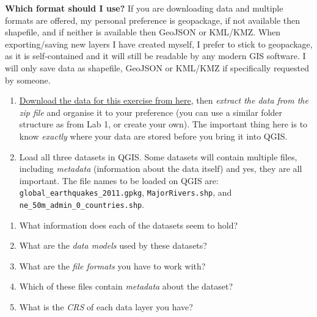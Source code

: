 \documentclass[
  letterpaper,
  DIV=11,
  numbers=noendperiod]{scrreprt}
\begin{document}
\begin{tcolorbox}
\textbf{Which format should I use?} If you are downloading data and
multiple formats are offered, my personal preference is geopackage, if
not available then shapefile, and if neither is available then GeoJSON
or KML/KMZ. When exporting/saving new layers I have created myself, I
prefer to stick to geopackage, as it is self-contained and it will still
be readable by any modern GIS software. I will only save data as
shapefile, GeoJSON or KML/KMZ if specifically requested by someone.

\end{tcolorbox}

\begin{enumerate}
\def\labelenumi{(\arabic{enumi})}
\setcounter{enumi}{68}
\item
  \href{https://stir-my.sharepoint.com/:f:/g/personal/ala2_stir_ac_uk/EkD-gndA8ihElmcQFirYbPEBN6qvH2tzyLgJ8UujpCXi2Q?e=tsvmoG}{Download
  the data for this exercise from here}, then \emph{extract the data
  from the zip file} and organise it to your preference (you can use a
  similar folder structure as from Lab 1, or create your own). The
  important thing here is to know \emph{exactly} where your data are
  stored before you bring it into QGIS.
\item
  Load all three datasets in QGIS. Some datasets will contain multiple
  files, including \emph{metadata} (information about the data itself)
  and yes, they are all important. The file names to be loaded on QGIS
  are: \texttt{global\_earthquakes\_2011.gpkg},
  \texttt{MajorRivers.shp}, and
  \texttt{ne\_50m\_admin\_0\_countries.shp}.
\end{enumerate}

\begin{tcolorbox}[enhanced jigsaw, breakable, toptitle=1mm, colback=white, left=2mm, leftrule=.75mm, titlerule=0mm, colframe=quarto-callout-important-color-frame, opacityback=0, title=\textcolor{quarto-callout-important-color}{\faExclamation}\hspace{0.5em}{Stop and Think}, toprule=.15mm, opacitybacktitle=0.6, bottomtitle=1mm, colbacktitle=quarto-callout-important-color!10!white, bottomrule=.15mm, coltitle=black, rightrule=.15mm, arc=.35mm]

\begin{enumerate}
\def\labelenumi{\alph{enumi})}
\item
  What information does each of the datasets seem to hold?
\item
  What are the \emph{data models} used by these datasets?
\item
  What are the \emph{file formats} you have to work with?
\item
  Which of these files contain \emph{metadata} about the dataset?
\item
  What is the \emph{CRS} of each data layer you have?
\end{enumerate}

\end{tcolorbox}
\end{document}
